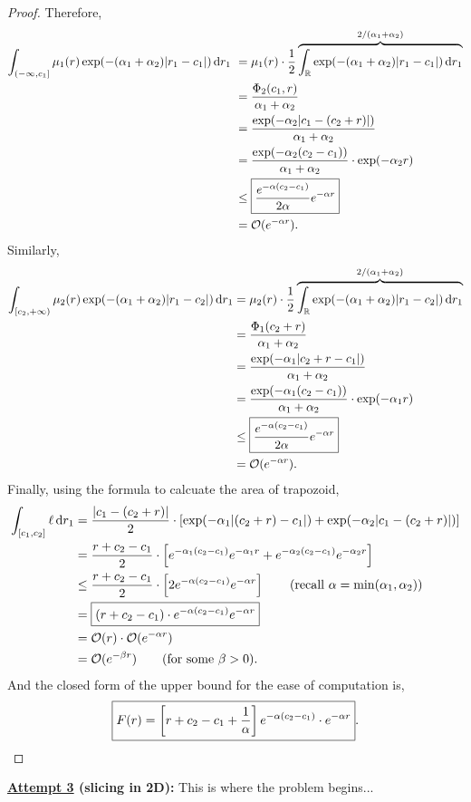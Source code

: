\documentclass[12pt]{article}
\begin{document}
\begin{proof}
Therefore,
\begin{align*}
    \int_{(-\infty,c_1]} \mu_1(r) \exp(-(\alpha_1 + \alpha_2)|r_1 - c_1|) \mathop{}\!\mathrm{d} r_1 \
    &= \mu_1(r)\cdot \frac{1}{2} \overbrace{\int_{\mathbb {R}} \exp(-(\alpha_1 + \alpha_2)|r_1 - c_1|) \mathop{}\!\mathrm{d} r_1}^{2/(\alpha_1 + \alpha_2)}\\
    &= \frac{\Phi_2(c_1, r)}{\alpha_1 + \alpha_2}\\
    &= \frac{\exp(-\alpha_2|c_1 - (c_2 + r)|)}{\alpha_1 + \alpha_2}\\
    &= \frac{\exp(-\alpha_2(c_2-c_1))}{\alpha_1 + \alpha_2} \cdot \exp(-\alpha_2 r)\\
    & \leq \boxed{\frac{e^{-\alpha(c_2 - c_1)}}{2 \alpha} e^{-\alpha r}}\\
    & = \mathcal{O}(e^{-\alpha r}).
\end{align*}
Similarly,
\begin{align*}
    \int_{[c_2,+\infty)} \mu_2(r) \exp(-(\alpha_1 + \alpha_2)|r_1 - c_2|) \mathop{}\!\mathrm{d} r_1
    & = \mu_2(r)  \cdot \frac{1}{2} \overbrace{\int_{\mathbb {R}} \exp(-(\alpha_1 + \alpha_2)|r_1 - c_2|) \mathop{}\!\mathrm{d} r_1}^{2/(\alpha_1 + \alpha_2)}\\
    & = \frac{\Phi_1(c_2 + r)}{\alpha_1 + \alpha_2}\\
    & = \frac{\exp(-\alpha_1|c_2 + r - c_1|)}{\alpha_1 + \alpha_2}\\
    & = \frac{\exp(-\alpha_1(c_2 - c_1))}{\alpha_1 + \alpha_2} \cdot \exp(-\alpha_1 r)\\
    & \leq \boxed{\frac{e^{-\alpha(c_2 - c_1)}}{2 \alpha} e^{-\alpha r}} \\
    & = \mathcal{O}(e^{-\alpha r}).
\end{align*}
Finally, using the formula to calcuate the area of trapozoid,
\begin{align*}
    \int_{[c_1,c_2]} \ell \mathop{}\!\mathrm{d} r_1 
    &= \frac{|c_1 - (c_2 + r)|}{2} \cdot \left[ \exp(-\alpha_1|(c_2 + r) - c_1|) + \exp(-\alpha_2|c_1 - (c_2 + r)|) \right]\\
    &=\frac{r + c_2 - c_1}{2} \cdot \left[ e^{-\alpha_1(c_2 - c_1)}e^{-\alpha_1 r} + e^{-\alpha_2(c_2 - c_1)}e^{-\alpha_2 r} \right]\\
    &\leq \frac{r + c_2 - c_1}{2} \cdot \left[ 2 e^{-\alpha(c_2 - c_1)}e^{-\alpha r} \right] \tag{recall \(\alpha = \min(\alpha_1, \alpha_2)\)}\\
    &=\boxed{(r + c_2 - c_1) \cdot e^{-\alpha(c_2 - c_1)}e^{-\alpha r}} \\
    & = \mathcal{O}(r) \cdot \mathcal{O}(e^{-\alpha r})\\
    & = \mathcal{O}(e^{-\beta r}) \tag{for some \(\beta > 0\)}.
\end{align*}
And the closed form of the upper bound for the ease of computation is,
\begin{align*}
    \boxed{F(r) = \left[ r + c_2 - c_1 + \frac{1}{\alpha} \right]e^{-\alpha(c_2 - c_1)} \cdot e^{-\alpha r}}.
\end{align*}
\end{proof}


\textbf{\underline{Attempt 3} (slicing in 2D):} This is where the problem begins...
\end{document}
